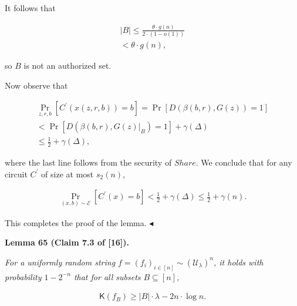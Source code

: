 \documentclass[10pt,a4paper]{article}
\begin{document}
It follows that\par


\[\begin{gathered}
\displaystyle|B| \displaystyle\leq\frac{\theta\cdot g(n)}{2\cdot(1-o(1))} \\
\displaystyle<\theta\cdot g(n),
\end{gathered}\]


so $B$ is not an authorized set.\par




Now observe that\par


\[\begin{gathered}
\displaystyle\Pr_{z,r,b}[C^{\prime}(x(z,r,b))=b] \displaystyle=\Pr[D(\beta(b,r),G(z))=1] \\
\displaystyle<\Pr[D(\beta(b,r),G(z)|_{B})=1]+\gamma(\Delta) \\
\displaystyle\leq\frac{1}{2}+\gamma(\Delta),
\end{gathered}\]


where the last line follows from the security of $Share$. We conclude that for any circuit $C^{\prime}$ of size at most $s_{2}(n)$,\par


\[\begin{gathered}
\Pr_{(x,b)\sim\mathcal{E}}[C^{\prime}(x)=b]<\frac{1}{2}+\gamma(\Delta)\leq\frac{1}{2}+\gamma(n).
\end{gathered}\]


This completes the proof of the lemma.
$\blacktriangleleft$\par





\par\medskip\noindent\textbf{
\textbf{Lemma 65}\textbf{ }(Claim 7.3 of [16])\textbf{.}
}\par



\emph{For a uniformly random string $f=(f_{i})_{i\in[n]}\sim(\mathcal{U}_{\lambda})^{n}$, it holds with probability $1-2^{-n}$ that for all subsets $B\subseteq[n]$,}\par


\[\begin{gathered}
{\mathsf{K}}(f_{B})\geq|B|\cdot\lambda-2n\cdot\log n.
\end{gathered}\]



\end{document}
